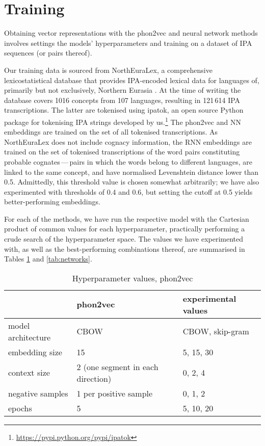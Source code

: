 \documentclass[a4paper]{report}
\begin{document}
\section{Training}

Obtaining vector representations with the phon2vec and neural network methods involves
settings the models' hyperparameters and training on a dataset of IPA sequences (or pairs thereof).

Our training data is sourced from NorthEuraLex, a comprehensive lexicostatistical database
that provides IPA-encoded lexical data for languages of, primarily but not exclusively, Northern Eurasia \citep{2017_Dellert_Jäger}.
At the time of writing the database covers 1016 concepts from 107 languages, resulting in 121\,614 IPA transcriptions.
The latter are tokenised using ipatok, an open source Python package for tokenising IPA strings developed by us.\footnote{\url{https://pypi.python.org/pypi/ipatok}}
The phon2vec and NN embeddings are trained on the set of all tokenised transcriptions.
As NorthEuraLex does not include cognacy information,
the RNN embeddings are trained on the set of tokenised transcriptions of the word pairs constituting probable cognates\,---\,pairs
in which the words belong to different languages, are linked to the same concept, and have normalised Levenshtein distance lower than 0.5.
Admittedly, this threshold value is chosen somewhat arbitrarily;
we have also experimented with thresholds of 0.4 and 0.6, but setting the cutoff at 0.5 yields better-performing embeddings.

For each of the methods, we have run the respective model with the Cartesian product of common values for each hyperparameter,
practically performing a crude search of the hyperparameter space.
The values we have experimented with, as well as the best-performing combinations thereof, are summarised in Tables \ref{tab:phon2vec} and \ref{tab:networks}.

\begin{table}[h]
	\centering\small
	\begin{tabular}{*{3}{l}}
		\toprule
		& phon2vec & experimental values \\
		\midrule
		model architecture & CBOW & CBOW, skip-gram \\
		embedding size & 15 & 5, 15, 30 \\
		context size & 2 (one segment in each direction) & 0, 2, 4 \\
		negative samples & 1 per positive sample & 0, 1, 2 \\
		epochs & 5 & 5, 10, 20 \\
		\bottomrule
	\end{tabular}
	\caption{Hyperparameter values, phon2vec}
	\label{tab:phon2vec}
\end{table}
\end{document}
